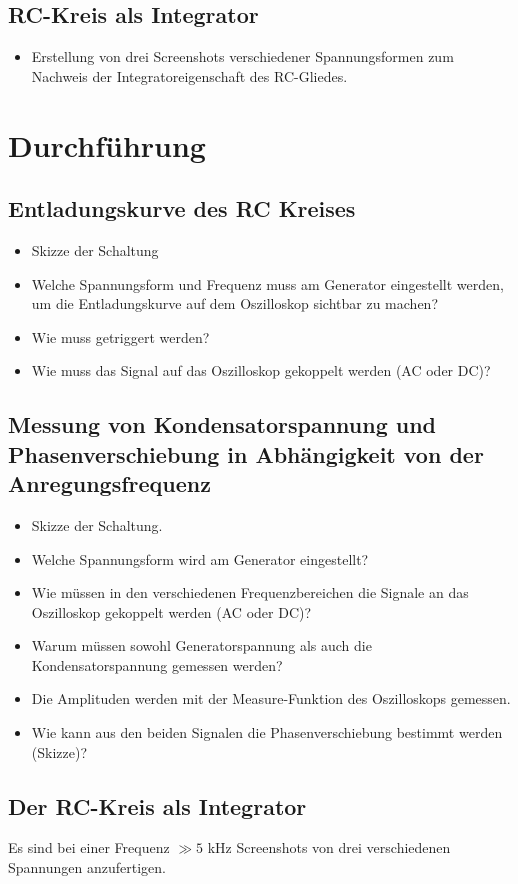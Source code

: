 \documentclass[11pt,a4paper]{article}
\begin{document}
\subsection{RC-Kreis als Integrator}
\begin{itemize}
\item Erstellung von drei Screenshots verschiedener Spannungsformen zum Nachweis der Integratoreigenschaft des RC-Gliedes.
\end{itemize}
\section{Durchführung}
\subsection{Entladungskurve des RC Kreises}
\begin{itemize}
\item Skizze der Schaltung
\item Welche Spannungsform und Frequenz muss am Generator eingestellt werden, um die Entladungskurve auf dem Oszilloskop sichtbar zu machen?
\item Wie muss getriggert werden?
\item Wie muss das Signal auf das Oszilloskop gekoppelt werden (AC oder DC)?
\end{itemize}
\subsection{Messung von Kondensatorspannung und Phasenverschiebung in Abhängigkeit von der Anregungsfrequenz}
\begin{itemize}
\item Skizze der Schaltung.
\item Welche Spannungsform wird am Generator eingestellt?
\item Wie müssen in den verschiedenen Frequenzbereichen die Signale an das Oszilloskop gekoppelt werden (AC oder DC)?
\item Warum müssen sowohl Generatorspannung als auch die Kondensatorspannung gemessen werden?
\item Die Amplituden werden mit der Measure-Funktion des Oszilloskops gemessen.
\item Wie kann aus den beiden Signalen die Phasenverschiebung bestimmt werden (Skizze)?
\end{itemize}
\subsection{Der RC-Kreis als Integrator}
Es sind bei einer Frequenz $\gg 5$ kHz Screenshots von drei verschiedenen Spannungen anzufertigen.
\end{document}
